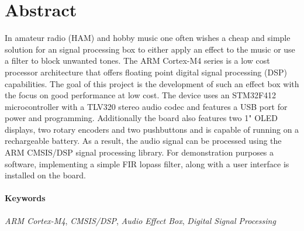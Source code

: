 \section*{Abstract}
\label{sec:Abstract}

In amateur radio (HAM) and hobby music one often wishes a cheap and simple solution for an signal processing box to either apply an effect to the music or use a filter to block unwanted tones.
The ARM Cortex-M4 series is a low cost processor architecture that offers floating point digital signal processing (DSP) capabilities.
The goal of this project is the development of such an effect box with the focus on good performance at low cost. 
The device uses an STM32F412 microcontroller with a TLV320 stereo audio codec and features a USB port for power and programming. Additionally the board also features two 1" OLED displays, two rotary encoders and two pushbuttons and is capable of running on a rechargeable battery.
As a result, the audio signal can be processed using the ARM CMSIS/DSP signal processing library. For demonstration purposes a software, implementing a simple FIR lopass filter, along with a user interface is installed on the board.


\paragraph{Keywords}

\textit{ARM Cortex-M4}, \textit{CMSIS/DSP}, \textit{Audio Effect Box}, \textit{Digital Signal Processing}


